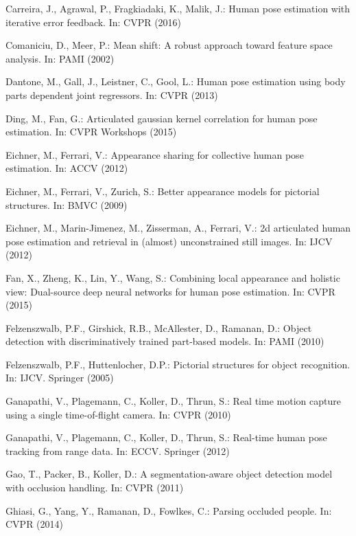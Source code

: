 \documentclass[runningheads]{llncs}
\begin{document}
\begin{thebibliography}{10}
	Carreira, J., Agrawal, P., Fragkiadaki, K., Malik, J.: Human pose estimation
	with iterative error feedback. In: CVPR (2016)

	Comaniciu, D., Meer, P.: Mean shift: A robust approach toward feature space
	analysis. In: PAMI (2002)

	Dantone, M., Gall, J., Leistner, C., Gool, L.: Human pose estimation using body
	parts dependent joint regressors. In: CVPR (2013)

	Ding, M., Fan, G.: Articulated gaussian kernel correlation for human pose
	estimation. In: CVPR Workshops (2015)

	Eichner, M., Ferrari, V.: Appearance sharing for collective human pose
	estimation. In: ACCV (2012)

	Eichner, M., Ferrari, V., Zurich, S.: Better appearance models for pictorial
	structures. In: BMVC (2009)

	Eichner, M., Marin-Jimenez, M., Zisserman, A., Ferrari, V.: 2d articulated
	human pose estimation and retrieval in (almost) unconstrained still images.
	In: IJCV (2012)

	Fan, X., Zheng, K., Lin, Y., Wang, S.: Combining local appearance and holistic
	view: Dual-source deep neural networks for human pose estimation. In: CVPR
	(2015)

	Felzenszwalb, P.F., Girshick, R.B., McAllester, D., Ramanan, D.: Object
	detection with discriminatively trained part-based models. In: PAMI (2010)

	Felzenszwalb, P.F., Huttenlocher, D.P.: Pictorial structures for object
	recognition. In: IJCV. Springer (2005)

	Ganapathi, V., Plagemann, C., Koller, D., Thrun, S.: Real time motion capture
	using a single time-of-flight camera. In: CVPR (2010)

	Ganapathi, V., Plagemann, C., Koller, D., Thrun, S.: Real-time human pose
	tracking from range data. In: ECCV. Springer (2012)

	Gao, T., Packer, B., Koller, D.: A segmentation-aware object detection model
	with occlusion handling. In: CVPR (2011)

	Ghiasi, G., Yang, Y., Ramanan, D., Fowlkes, C.: Parsing occluded people. In:
	CVPR (2014)


\end{thebibliography}
\end{document}
